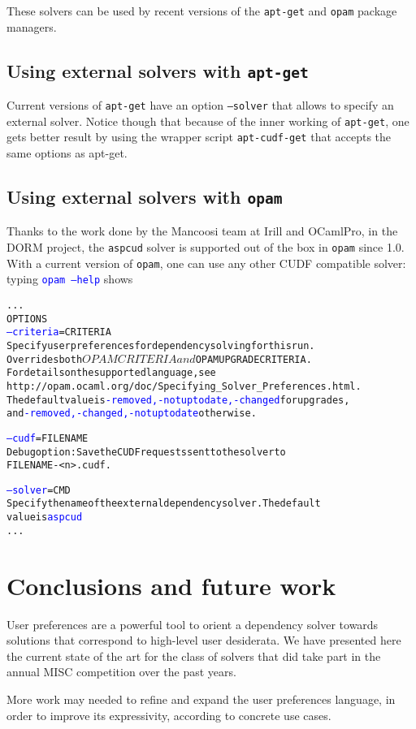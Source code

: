 \documentclass{article}
\begin{document}
These solvers can be used by recent versions of the \texttt{apt-get} and \texttt{opam} package managers.

\subsection{Using external solvers with \texttt{apt-get}}

Current versions of \texttt{apt-get} have an option \texttt{--solver} that allows to specify an external
solver. Notice though that because of the inner working of \texttt{apt-get}, one gets better result
by using the wrapper script \texttt{apt-cudf-get} that accepts the same options as apt-get.

\subsection{Using external solvers with \texttt{opam}}
Thanks to the work done by the Mancoosi team at Irill and OCamlPro, in the DORM project,
the \texttt{aspcud} solver is supported out of the box in \texttt{opam} since 1.0.
With a current version of \texttt{opam}, one can use any other CUDF compatible solver:
typing \textcolor{blue}{\texttt{opam --help}} shows 

\begin{alltt}
...
OPTIONS
  \textcolor{blue}{--criteria}=CRITERIA
      Specify user preferences for dependency solving for this run.
      Overrides both $OPAMCRITERIA and $OPAMUPGRADECRITERIA. 
      For details on the supported language, see
      http://opam.ocaml.org/doc/Specifying_Solver_Preferences.html. 
      The default value is \textcolor{blue}{-removed,-notuptodate,-changed} for upgrades,
      and \textcolor{blue}{-removed,-changed,-notuptodate} otherwise.

  \textcolor{blue}{--cudf}=FILENAME
      Debug option: Save the CUDF requests sent to the solver to
      FILENAME-<n>.cudf.

  \textcolor{blue}{--solver}=CMD
      Specify the name of the external dependency solver. The default
      value is \textcolor{blue}{aspcud}
...
\end{alltt}

\section{Conclusions and future work}
User preferences are a powerful tool to orient a dependency solver towards solutions that correspond
to high-level user desiderata. We have presented here the current state of the art for the class of
solvers that did take part in the annual MISC competition over the past years.

More work may needed to refine and expand the user preferences language, in order to improve its
expressivity, according to concrete use cases.

\nocite{packup-2010, MCCS-2010}



\end{document}
